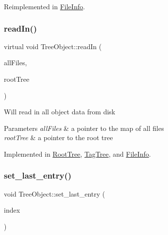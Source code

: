 Reimplemented in \mbox{\hyperlink{classFileInfo_a278136b1d68f55dc56a4be807076fc0d}{File\+Info}}.

\mbox{\label{classTreeObject_a8247e79f2b4c1760649ac6f1af1c583f}} 
\subsubsection{\texorpdfstring{read\+In()}{readIn()}}
{\footnotesize\ttfamily virtual void Tree\+Object\+::read\+In (\begin{DoxyParamCaption}\item[{unordered\+\_\+multimap$<$ string, \mbox{\hyperlink{classFileInfo}{File\+Info}} $\ast$$>$ $\ast$}]{all\+Files,  }\item[{\mbox{\hyperlink{classRootTree}{Root\+Tree}} $\ast$}]{root\+Tree }\end{DoxyParamCaption})\hspace{0.3cm}{\ttfamily [pure virtual]}}

Will read in all object data from disk 
\begin{DoxyParams}{Parameters}
{\em all\+Files} & a pointer to the map of all files \\
\hline
{\em root\+Tree} & a pointer to the root tree \\
\hline
\end{DoxyParams}


Implemented in \mbox{\hyperlink{classRootTree_a1d1084e9fc3333f10b3146d096da1dd4}{Root\+Tree}}, \mbox{\hyperlink{classTagTree_a2e72921ccc19667331c64d3d0100b269}{Tag\+Tree}}, and \mbox{\hyperlink{classFileInfo_a0e74605dd535e73027ad1c1c6242db09}{File\+Info}}.

\mbox{\label{classTreeObject_a2ec94bc9d2647275049ddf2a70b8510e}} 
\subsubsection{\texorpdfstring{set\+\_\+last\+\_\+entry()}{set\_last\_entry()}}
{\footnotesize\ttfamily void Tree\+Object\+::set\+\_\+last\+\_\+entry (\begin{DoxyParamCaption}\item[{\mbox{\hyperlink{structindex}{Index}}}]{index }\end{DoxyParamCaption})}

